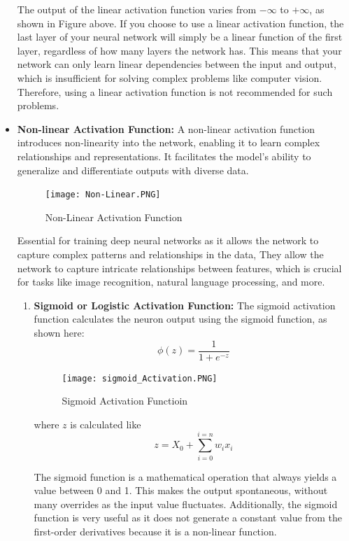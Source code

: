 \begin{itemize}
    The output of the linear activation function varies from $-\infty$ to  $+\infty$, as shown in Figure above.
     If you choose to use a linear activation function, the last layer of your neural network will simply be a linear function of the first layer, regardless of how many layers the network has. This means that your network can only learn linear dependencies between the input and output, which is insufficient for solving complex problems like computer vision. Therefore, using a linear activation function is not recommended for such problems. \cite{bfortuner_mlglossary}\\
     \item \textbf{Non-linear Activation Function: } A non-linear activation function introduces non-linearity into the network, enabling it to learn complex relationships and representations. It facilitates the model's ability to generalize and differentiate outputs with diverse data.
    \begin{figure}[H]
        \centering\texttt{[image: Non-Linear.PNG]}
        \caption{Non-Linear Activation Function}
    \end{figure}
    Essential for training deep neural networks as it allows the network to capture complex patterns and relationships in the data, They allow the network to capture intricate relationships between features, which is crucial for tasks like image recognition, natural language processing, and more.
    \begin{enumerate}
        \item \textbf{Sigmoid or Logistic Activation Function: } 
    The sigmoid activation function calculates the neuron output using the sigmoid function, as shown here:
    $$\phi(z)=\frac{1}{1+e^{-z}}$$
    \begin{figure}[H]
        \centering\texttt{[image: sigmoid\_Activation.PNG]}
        \caption{Sigmoid Activation Functioin}
    \end{figure}
    where \(z\) is calculated like \\
    
    $$z=X_0+\sum_{i=0}^{i=n}w_{i}x_{i}$$
    
    The sigmoid function is a mathematical operation that always yields a value between 0 and 1. This makes the output spontaneous, without many overrides as the input value fluctuates. Additionally, the sigmoid function is very useful as it does not generate a constant value from the first-order derivatives because it is a non-linear function.
    

\end{enumerate}
\end{itemize}
